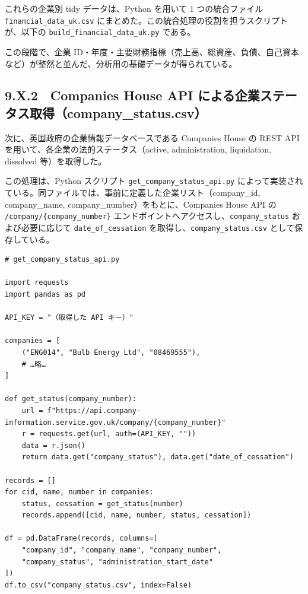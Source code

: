 これらの企業別 tidy データは、Python を用いて 1 つの統合ファイル \texttt{financial\_data\_uk.csv} にまとめた。この統合処理の役割を担うスクリプトが、以下の \texttt{build\_financial\_data\_uk.py} である。

\vspace{1em} %

この段階で、企業 ID・年度・主要財務指標（売上高、総資産、負債、自己資本など）が整然と並んだ、分析用の基礎データが得られている。



\subsection*{9.X.2　Companies House API による企業ステータス取得（company\_status.csv）}

次に、英国政府の企業情報データベースである Companies House の REST API を用いて、各企業の法的ステータス（active, administration, liquidation, dissolved 等）を取得した。

この処理は、Python スクリプト \texttt{get\_company\_status\_api.py} によって実装されている。同ファイルでは、事前に定義した企業リスト（company\_id, company\_name, company\_number）をもとに、Companies House API の
\texttt{/company/\{company\_number\}} エンドポイントへアクセスし、\texttt{company\_status} および必要に応じて \texttt{date\_of\_cessation} を取得し、\texttt{company\_status.csv} として保存している。


\begin{verbatim}
# get_company_status_api.py

import requests
import pandas as pd

API_KEY = "（取得した API キー）"

companies = [
    ("ENG014", "Bulb Energy Ltd", "08469555"),
    # …略…
]

def get_status(company_number):
    url = f"https://api.company-information.service.gov.uk/company/{company_number}"
    r = requests.get(url, auth=(API_KEY, ""))
    data = r.json()
    return data.get("company_status"), data.get("date_of_cessation")

records = []
for cid, name, number in companies:
    status, cessation = get_status(number)
    records.append([cid, name, number, status, cessation])

df = pd.DataFrame(records, columns=[
    "company_id", "company_name", "company_number",
    "company_status", "administration_start_date"
])
df.to_csv("company_status.csv", index=False)
\end{verbatim}



